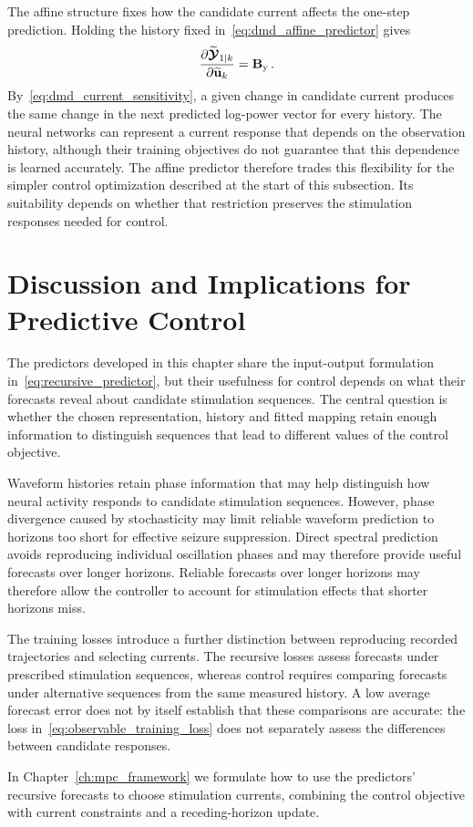 The affine structure fixes how the candidate current affects the one-step prediction.
Holding the history fixed in~\eqref{eq:dmd_affine_predictor} gives
\begin{equation}
    \frac{\partial\widetilde{\boldsymbol{\mathcal{Y}}{}}_{1|k}}
    {\partial\widetilde{\mathbf{u}}_k}
    =\mathbf{B}_\mathrm{y}\,.
    \label{eq:dmd_current_sensitivity}
\end{equation}
By~\eqref{eq:dmd_current_sensitivity}, a given change in candidate current produces the same change in the next predicted log-power vector for every history.
The neural networks can represent a current response that depends on the observation history, although their training objectives do not guarantee that this dependence is learned accurately.
The affine predictor therefore trades this flexibility for the simpler control optimization described at the start of this subsection.
Its suitability depends on whether that restriction preserves the stimulation responses needed for control.

\section{Discussion and Implications for Predictive Control}\label{sec:predictor_control_implications}

The predictors developed in this chapter share the input-output formulation in~\eqref{eq:recursive_predictor}, but their usefulness for control depends on what their forecasts reveal about candidate stimulation sequences.
The central question is whether the chosen representation, history and fitted mapping retain enough information to distinguish sequences that lead to different values of the control objective.

Waveform histories retain phase information that may help distinguish how neural activity responds to candidate stimulation sequences.
However, phase divergence caused by stochasticity may limit reliable waveform prediction to horizons too short for effective seizure suppression.
Direct spectral prediction avoids reproducing individual oscillation phases and may therefore provide useful forecasts over longer horizons.
Reliable forecasts over longer horizons may therefore allow the controller to account for stimulation effects that shorter horizons miss.

The training losses introduce a further distinction between reproducing recorded trajectories and selecting currents.
The recursive losses assess forecasts under prescribed stimulation sequences, whereas control requires comparing forecasts under alternative sequences from the same measured history.
A low average forecast error does not by itself establish that these comparisons are accurate: the loss in~\eqref{eq:observable_training_loss} does not separately assess the differences between candidate responses.

In Chapter~\ref{ch:mpc_framework} we formulate how to use the predictors' recursive forecasts to choose stimulation currents, combining the control objective with current constraints and a receding-horizon update.
